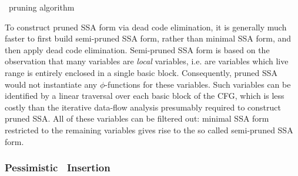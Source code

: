 \begin{algorithm}
\caption{\label{alg:classical_construction_algorithm:pruning}
\phiop\ pruning algorithm
}
\end{algorithm}

To construct pruned SSA form via dead code elimination,
it is generally much faster to first build semi-pruned SSA
form, rather than minimal SSA form, and then apply
dead code elimination.
Semi-pruned SSA form is based on the observation that
many variables are \emph{local} variables, i.e. are variables which live range is entirely enclosed in a single basic block. Consequently, pruned SSA would not 
instantiate any $\phi$-functions for these variables.
Such variables can be identified by a linear traversal
over each basic block of the CFG, which is less costly
than the iterative data-flow analysis presumably required
to construct pruned SSA. 
All of these variables
can be filtered out: minimal SSA form restricted to the remaining variables gives rise to the so called semi-pruned SSA form.




\subsubsection*{Pessimistic \phiop\ Insertion}

